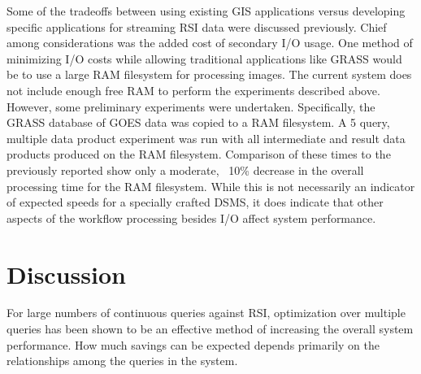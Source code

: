 \documentclass{ucdthesis}       %
\begin{document}
Some of the tradeoffs between using existing \ac{GIS} applications
versus developing specific applications for streaming \ac{RSI} data
were discussed previously.  Chief among considerations was the added
cost of secondary I/O usage.  One method of minimizing I/O costs while
allowing traditional applications like \ac{GRASS} would be to use a
large RAM filesystem for processing images.  The current system does
not include enough free RAM to perform the experiments described
above.  However, some preliminary experiments were undertaken.
Specifically, the \ac{GRASS} database of \ac{GOES} data was copied to
a RAM filesystem.  A 5 query, multiple data product experiment was run
with all intermediate and result data products produced on the RAM
filesystem.  Comparison of these times to the previously reported
show only a moderate, ~10\% decrease in the overall processing time
for the RAM filesystem.  While this is not necessarily an indicator of
expected speeds for a specially crafted \ac{DSMS}, it does indicate
that other aspects of the workflow processing besides I/O affect
system performance.




\section{Discussion}
\label{sec:gis-conclusions}

For large numbers of continuous queries against \ac{RSI}, optimization
over multiple queries has been shown to be an effective method of
increasing the overall system performance.  How much savings can be
expected depends primarily on the relationships among the queries in
the system.
\end{document}
